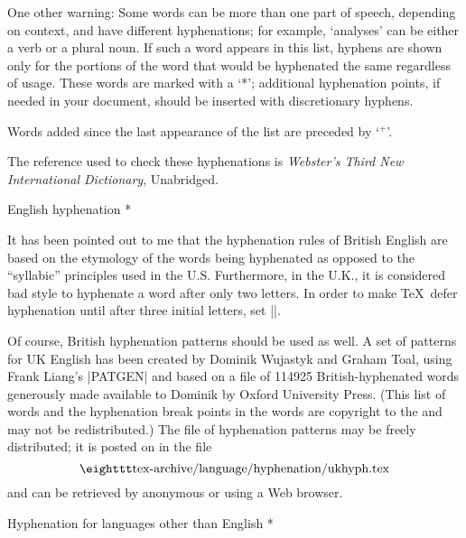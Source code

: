 One other warning: Some words can be more than one part of speech,
depending on context, and have different hyphenations; for example,
`analyses' can be either a verb or a plural noun.  If such a word appears
in this list, hyphens are shown only for the portions of the word that
would be hyphenated the same regardless of usage.  These words are marked
with a `*'; additional hyphenation points, if needed in your document,
should be inserted with discretionary hyphens.

Words added since the last appearance of the list are preceded by `${}^+$'.

The reference used to check these hyphenations is {\sl Webster's
Third New International Dictionary}, Unabridged.

\head * English hyphenation *

It has been pointed out to me that the hyphenation rules of British English
are based on the etymology of the words being hyphenated as opposed to
the ``syllabic'' principles used in the U.S\null.  Furthermore, in the
U.K., it is considered bad style to hyphenate a word after only two letters.
In order to make \TeX\ defer hyphenation until after three initial letters,
set ||.

Of course, British hyphenation patterns should be used as well.
A set of patterns for UK English has been created by Dominik Wujastyk and
Graham Toal, using Frank Liang's |PATGEN| and based on a file of 114925
British-hyphenated words generously made available to Dominik by Oxford
University Press.  (This list of words and the hyphenation break points
in the words are copyright to the  and may not be redistributed.)
The file of hyphenation patterns may be freely distributed; it is
posted on {\CTAN} in the file
$$\hbox{\tt tex-archive/language/hyphenation/ukhyph.tex}$$
and can be retrieved by anonymous  or using a Web browser.


%

\head * Hyphenation for languages \break other than English *

